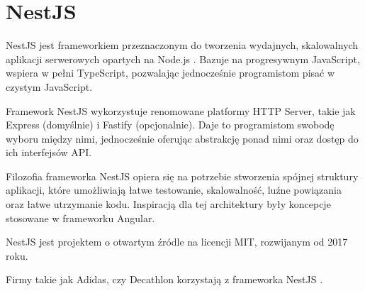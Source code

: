 \section{NestJS}


NestJS jest frameworkiem przeznaczonym do tworzenia wydajnych, skalowalnych aplikacji serwerowych opartych na Node.js \cite{nestjsDocumentationNestJS}.
Bazuje na progresywnym JavaScript, wspiera w pełni TypeScript, pozwalając jednocześnie programistom pisać w czystym JavaScript.

Framework NestJS wykorzystuje renomowane platformy HTTP Server, takie jak Express (domyślnie) i Fastify (opcjonalnie).
Daje to programistom swobodę wyboru między nimi, jednocześnie oferując abstrakcję ponad nimi oraz dostęp do ich interfejsów API.

Filozofia frameworka NestJS opiera się na potrzebie stworzenia spójnej struktury aplikacji, które umożliwiają łatwe testowanie, skalowalność, luźne powiązania oraz łatwe utrzymanie kodu.
Inspiracją dla tej architektury były koncepcje stosowane w frameworku Angular.

NestJS jest projektem o otwartym źródle na licencji MIT, rozwijanym od 2017 roku.

Firmy takie jak Adidas, czy Decathlon korzystają z frameworka NestJS \cite{reveloHeresHire}.
